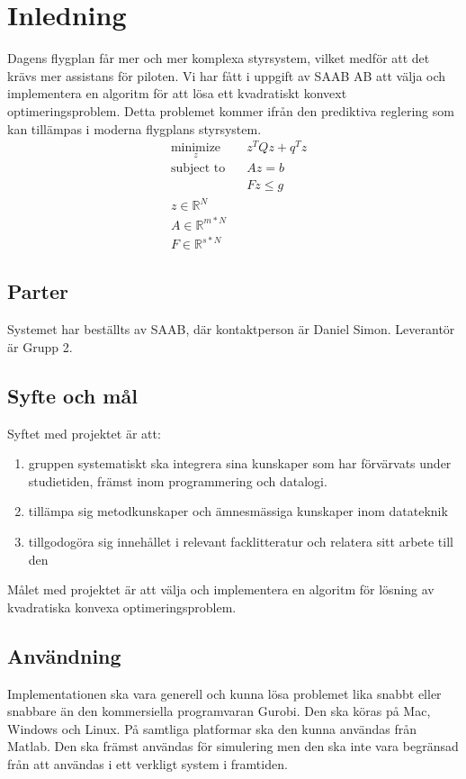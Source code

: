 \section{Inledning}
Dagens flygplan får mer och mer komplexa styrsystem, vilket medför att det krävs mer assistans för piloten. Vi har fått i uppgift av SAAB AB att välja och implementera en algoritm för att lösa ett kvadratiskt konvext optimeringsproblem. Detta problemet kommer ifrån den prediktiva reglering som kan tillämpas i moderna flygplans styrsystem.
\begin{equation*}
\begin{aligned}
& \underset{z}{\text{minimize}}
& & z^{T}Qz+q^{T}z \\
& \text{subject to}
& & Az=b \\
& & & Fz \leq g \\
& z \in \mathbb{R}^N \\
& A \in \mathbb{R}^{m*N}\\
& F \in \mathbb{R}^{s*N}
\end{aligned}
\end{equation*}
\subsection{Parter}
Systemet har beställts av SAAB, där kontaktperson är Daniel Simon. Leverantör är Grupp 2.

\subsection{Syfte och mål}
Syftet med projektet är att:
\begin{enumerate}
 \item gruppen systematiskt ska integrera sina kunskaper som har förvärvats under studietiden, främst inom programmering och datalogi. 
 \item tillämpa sig  metodkunskaper och ämnesmässiga kunskaper inom datateknik
 \item tillgodogöra sig innehållet i relevant facklitteratur och relatera sitt arbete till den
\end{enumerate}

Målet med projektet är att välja och implementera en algoritm för lösning av kvadratiska konvexa optimeringsproblem.

\subsection{Användning}
Implementationen ska vara generell och kunna lösa problemet lika snabbt eller snabbare än den kommersiella programvaran Gurobi. Den ska köras på Mac, Windows och Linux. På samtliga platformar ska den kunna användas från Matlab. Den ska främst användas för simulering men den ska inte vara begränsad från att användas i ett verkligt system i framtiden. 

